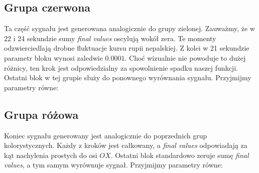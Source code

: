 \documentclass[12pt]{mwart}
\begin{document}
	\subsection{Grupa czerwona}
	\noindent Ta część sygnału jest generowana analogicznie do grupy zielonej. Zauważmy, że w 22 i 24 sekundzie sumy \textit{final values} oscylują wokół zera. Te momenty odzwierciedlają drobne fluktuacje kursu rupii nepalskiej. Z kolei w 21 sekundzie parametr bloku wynosi zaledwie $0.0001$. Choć wizualnie nie powoduje to dużej różnicy, ten krok jest odpowiedzialny za spowolnienie spadku naszej funkcji. Ostatni blok w tej grupie służy do ponownego wyrównania sygnału. Przyjmijmy parametry równe:
	
	\begin{table}[H]
    \centering
	\end{table}
	
	
	
	\subsection{Grupa różowa}
	\noindent Koniec sygnału generowany jest analogicznie do poprzednich grup kolorystycznych. Każdy z kroków jest całkowany, a \textit{final values} odpowiadają za kąt nachylenia prostych do osi $OX$. Ostatni blok standardowo zeruje sumę \textit{final values}, a tym samym wyrównuje sygnał. Przyjmijmy parametry równe:
	
	
	\begin{table}[H]
    \centering
	\end{table}
	
\end{document}
